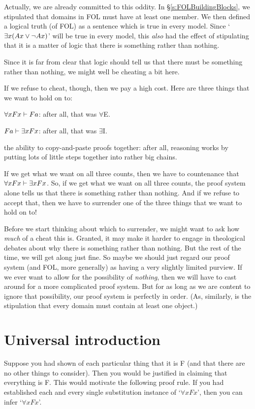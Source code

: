 Actually, we are already committed to this oddity. In \S\ref{s:FOLBuildingBlocks}, we stipulated that domains in FOL must have at least one member. We then defined a logical truth (of FOL) as a sentence which is true in every model. Since `$\exists x(Ax\vee\neg Ax)$' will be true in every model, this \emph{also} had the effect of stipulating that it is a matter of logic that there is something rather than nothing.

Since it is far from clear that logic should tell us that there must be something rather than nothing, we might well be cheating a bit here.

If we refuse to cheat, though, then we pay a high cost. Here are three things that we want to hold on to:
	\begin{ebullet}
		\item $\forall x Fx \vdash Fa$: after all, that was $\forall$E.
		\item $Fa \vdash \exists x Fx$: after all, that was $\exists$I.
		\item the ability to copy-and-paste proofs together: after all, reasoning works by putting lots of little steps together into rather big chains.
	\end{ebullet}
If we get what we want on all three counts, then we have to countenance that $\forall xFx \vdash \exists x Fx$. So, if we get what we want on all three counts, the proof system alone tells us that there is something rather than nothing. And if we refuse to accept that, then we have to surrender one of the three things that we want to hold on to!

Before we start thinking about which to surrender, we might want to ask how \emph{much} of a cheat this is. Granted, it may make it harder to engage in theological debates about why there is something rather than nothing. But the rest of the time, we will get along just fine. So maybe we should just regard our proof system (and FOL, more generally) as having a very slightly limited purview. If we ever want to allow for the possibility of \emph{nothing}, then we will have to cast around for a more complicated proof system. But for as long as we are content to ignore that possibility, our proof system is perfectly in order. (As, similarly, is the stipulation that every domain must contain at least one object.)


\section{Universal introduction}
Suppose you had shown of each particular thing that it is F (and that there are no other things to consider). Then you would be justified in claiming that everything is F. This would motivate the following proof rule. If you had established each and every single substitution instance of `$\forall x Fx$', then you can infer `$\forall x Fx$'.

